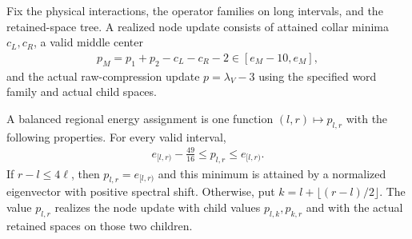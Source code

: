 \begin{definition}
    \label{def:balanced_regional_energy_assignment}
    \leanok
    Fix the physical interactions, the operator families on long intervals,
    and the retained-space tree. A realized node update consists of attained
    collar minima $c_L,c_R$, a valid middle center
    \begin{align}
        p_M=p_1+p_2-c_L-c_R-2\in[e_M-10,e_M],
    \end{align}
    and the actual raw-compression update $p=\lambda_V-3$ using the
    specified word family and actual child spaces.

    A balanced regional energy assignment is one function $(l,r)\mapsto p_{l,r}$
    with the following properties. For every valid interval,
    \begin{align}
        e_{[l,r)}-\frac{49}{16}\le p_{l,r}\le e_{[l,r)}.
    \end{align}
    If $r-l\le4\ell$, then $p_{l,r}=e_{[l,r)}$ and this minimum is
    attained by a normalized eigenvector with positive spectral shift.
    Otherwise, put $k=l+\lfloor(r-l)/2\rfloor$. The value $p_{l,r}$
    realizes the node update with child values $p_{l,k},p_{k,r}$ and
    with the actual retained spaces on those two children.
\end{definition}

